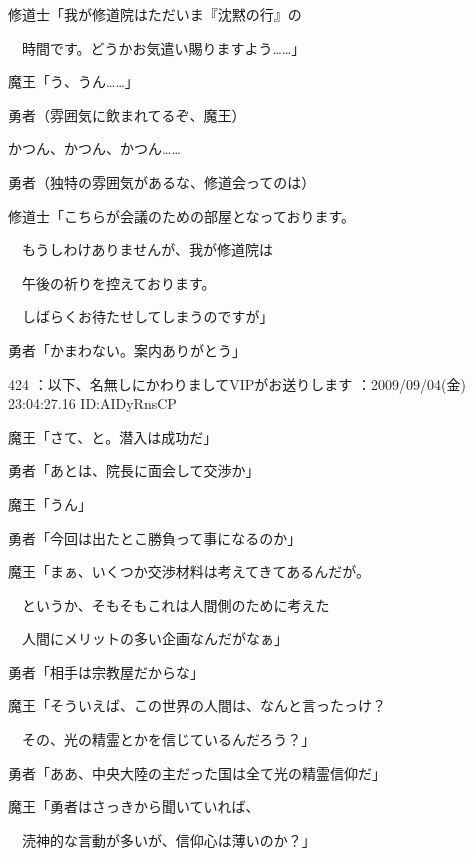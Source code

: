 \documentclass[a4j,twocolumn]{tarticle}
\begin{document}
修道士「我が修道院はただいま『沈黙の行』の\par{} 
　時間です。どうかお気遣い賜りますよう……」 



魔王「う、うん……」\par{} 
勇者（雰囲気に飲まれてるぞ、魔王） 



かつん、かつん、かつん…… 



勇者（独特の雰囲気があるな、修道会ってのは） 



修道士「こちらが会議のための部屋となっております。\par{} 
　もうしわけありませんが、我が修道院は\par{} 
　午後の祈りを控えております。\par{} 
　しばらくお待たせしてしまうのですが」 



勇者「かまわない。案内ありがとう」 

	
    
    

424 ：以下、名無しにかわりましてVIPがお送りします ：2009/09/04(金) 23:04:27.16 ID:AIDyRnsCP 


魔王「さて、と。潜入は成功だ」\par{} 
勇者「あとは、院長に面会して交渉か」\par{} 
魔王「うん」 \par{}
勇者「今回は出たとこ勝負って事になるのか」 



魔王「まぁ、いくつか交渉材料は考えてきてあるんだが。\par{} 
　というか、そもそもこれは人間側のために考えた\par{} 
　人間にメリットの多い企画なんだがなぁ」\par{} 
勇者「相手は宗教屋だからな」 



魔王「そういえば、この世界の人間は、なんと言ったっけ？ \par{}
　その、光の精霊とかを信じているんだろう？」\par{} 
勇者「ああ、中央大陸の主だった国は全て光の精霊信仰だ」 



魔王「勇者はさっきから聞いていれば、\par{} 
　涜神的な言動が多いが、信仰心は薄いのか？」 
\end{document}
